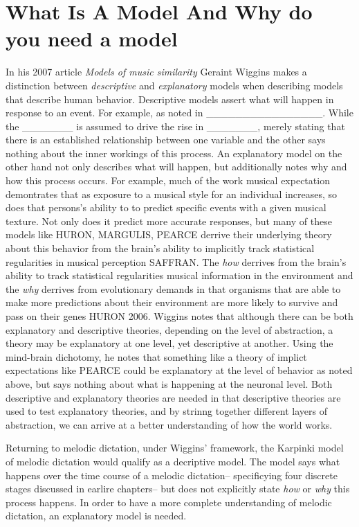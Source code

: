 \documentclass[]{book}
\theoremstyle{definition}
\theoremstyle{definition}
\theoremstyle{definition}
\theoremstyle{remark}
\begin{document}
\hypertarget{what-is-a-model-and-why-do-you-need-a-model}{%
\section{What Is A Model And Why do you need a
model}\label{what-is-a-model-and-why-do-you-need-a-model}}

In his 2007 article \emph{Models of music similarity}
\citep{wigginsModelsMusicalSimilarity2007} Geraint Wiggins makes a
distinction between \emph{descriptive} and \emph{explanatory} models
when describing models that describe human behavior. Descriptive models
assert what will happen in response to an event. For example, as noted
in \_\_\_\_\_\_\_\_\_\_\_\_\_\_\_\_. While the \_\_\_\_\_\_\_ is assumed
to drive the rise in \_\_\_\_\_\_\_, merely stating that there is an
established relationship between one variable and the other says nothing
about the inner workings of this process. An explanatory model on the
other hand not only describes what will happen, but additionally notes
why and how this process occurs. For example, much of the work musical
expectation demontrates that as exposure to a musical style for an
individual increases, so does that persons's ability to to predict
specific events with a given musical texture. Not only does it predict
more accurate responses, but many of these models like HURON, MARGULIS,
PEARCE derrive their underlying theory about this behavior from the
brain's ability to implicitly track statistical regularities in musical
perception SAFFRAN. The \emph{how} derrives from the brain's ability to
track statistical regularities musical information in the environment
and the \emph{why} derrives from evolutionary demands in that organisms
that are able to make more predictions about their environment are more
likely to survive and pass on their genes HURON 2006. Wiggins notes that
although there can be both explanatory and descriptive theories,
depending on the level of abstraction, a theory may be explanatory at
one level, yet descriptive at another. Using the mind-brain dichotomy,
he notes that something like a theory of implict expectations like
PEARCE could be explanatory at the level of behavior as noted above, but
says nothing about what is happening at the neuronal level. Both
descriptive and explanatory theories are needed in that descriptive
theories are used to test explanatory theories, and by strinng together
different layers of abstraction, we can arrive at a better understanding
of how the world works.

Returning to melodic dictation, under Wiggins' framework, the Karpinki
model of melodic dictation
\citep{karpinskiAuralSkillsAcquisition2000, karpinskiModelMusicPerception1990}
would qualify as a decriptive model. The model says what happens over
the time course of a melodic dictation-- specificying four discrete
stages discussed in earlire chapters-- but does not explicitly state
\emph{how} or \emph{why} this process happens. In order to have a more
complete understanding of melodic dictation, an explanatory model is
needed.
\end{document}
